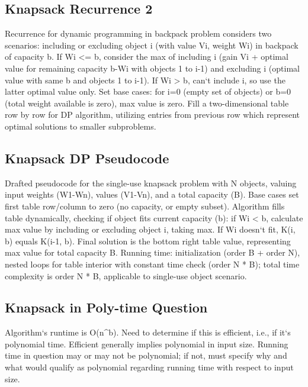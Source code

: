 \subsection*{Knapsack  Recurrence 2}
Recurrence for dynamic programming in backpack problem considers two scenarios: including or excluding object i (with value Vi, weight Wi) in backpack of capacity b.
If Wi \textless{}= b, consider the max of including i (gain Vi + optimal value for remaining capacity b-Wi with objects 1 to i-1) and excluding i (optimal value with same b and objects 1 to i-1).
If Wi \textgreater{} b, can`t include i, so use the latter optimal value only.
Set base cases: for i=0 (empty set of objects) or b=0 (total weight available is zero), max value is zero.
Fill a two-dimensional table row by row for DP algorithm, utilizing entries from previous row which represent optimal solutions to smaller subproblems.

\subsection*{Knapsack  DP Pseudocode}
Drafted pseudocode for the single-use knapsack problem with N objects, valuing input weights (W1-Wn), values (V1-Vn), and a total capacity (B).
Base cases set first table row/column to zero (no capacity, or empty subset).
Algorithm fills table dynamically, checking if object fits current capacity (b): if Wi \textless{} b, calculate max value by including or excluding object i, taking max.
If Wi doesn`t fit, K(i, b) equals K(i-1, b).
Final solution is the bottom right table value, representing max value for total capacity B\@.
Running time: initialization (order B + order N), nested loops for table interior with constant time check (order N * B); total time complexity is order N * B, applicable to single-use object scenario.

\subsection*{Knapsack in Poly-time Question}
Algorithm`s runtime is O(n\textasciicircum{}b).
Need to determine if this is efficient, i.e., if it`s polynomial time.
Efficient generally implies polynomial in input size.
Running time in question may or may not be polynomial; if not, must specify why and what would qualify as polynomial regarding running time with respect to input size.

